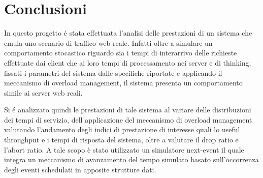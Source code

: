 \section{Conclusioni}

In questo progetto \'e stata effettuata l’analisi delle prestazioni di un 
sistema che emula uno scenario di traffico web reale.
Infatti oltre a simulare un comportamento stocastico riguardo sia i tempi di interarrivo delle 
richieste effettuate dai client che ai loro tempi di processamento nei server e di thinking, 
fissati i parametri del sistema dalle specifiche riportate e applicando il meccanismo di 
overload management, il sistema presenta un comportamento simile ai server web reali. 

Si \'e analizzato quindi le prestazioni di tale sistema al variare delle distribuzioni dei tempi di 
servizio, dell applicazione del meccanismo di overload management valutando l’andamento 
degli indici di prestazione di interesse quali lo useful throughput e i tempi di risposta del 
sistema, oltre a valutare il drop ratio e l’abort ratio. A tale scopo è stato utilizzato un 
simulatore next-event il quale integra un meccanismo di avanzamento del tempo simulato 
basato sull’occorrenza degli eventi schedulati in apposite strutture dati.